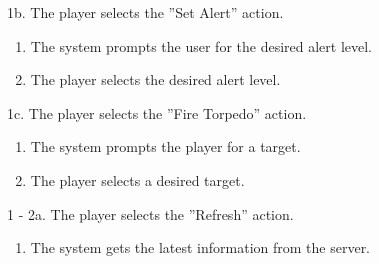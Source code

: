 1b. The player selects the ''Set Alert'' action.
\begin{enumerate}
	\item The system prompts the user for the desired alert level.
	\item The player selects the desired alert level.
\end{enumerate}

1c. The player selects the ''Fire Torpedo'' action.
\begin{enumerate}
	\item The system prompts the player for a target.
	\item The player selects a desired target.
\end{enumerate}

1 - 2a. The player selects the ''Refresh'' action.
\begin{enumerate}
	\item The system gets the latest information from the server.
\end{enumerate}
